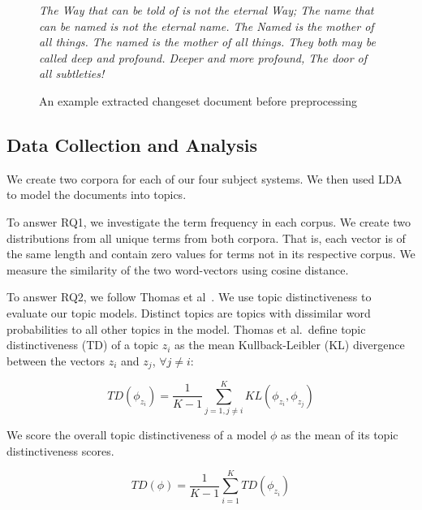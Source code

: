\begin{figure}[ht]
\em
\footnotesize
The Way that can be told of is not the eternal Way;
The name that can be named is not the eternal name.
The Named is the mother of all things.
The named is the mother of all things.
They both may be called deep and profound.
Deeper and more profound,
The door of all subtleties!
\caption{An example extracted changeset document before preprocessing}
\label{fig:diffdocument}
\end{figure}




\subsection{Data Collection and Analysis}

We create two corpora for each of our four subject systems.
We then used LDA to model the documents into topics.

To answer RQ1, we investigate the term frequency in each corpus.
We create two distributions from all unique terms from both corpora.
That is, each vector is of the same length and contain zero values for terms not in its respective corpus.
We measure the similarity of the two word-vectors using cosine distance.

To answer RQ2, we follow Thomas et al~\cite{Thomas-etal:2011}.
We use topic distinctiveness to evaluate our topic models.
Distinct topics are topics with dissimilar word probabilities to all other topics in the model.
Thomas et al.\ define topic distinctiveness (TD) of a topic $z_i$ as the mean
Kullback-Leibler (KL) divergence between the vectors $z_i$ and $z_j$, $\forall j \neq i$:

\begin{equation}
TD(\phi_{z_i}) =
\frac{1}{K - 1}
\sum_{j=1,j \neq i}^{K}
KL(\phi_{z_i}, \phi_{z_j})
\label{eq:topicdistinctiveness}
\end{equation}

We score the overall topic distinctiveness of a model $\phi$ as the mean of
its topic distinctiveness scores.

\begin{equation}
TD(\phi) =
\frac{1}{K - 1}
\sum_{i=1}^{K}
TD(\phi_{z_i})
\label{eq:overalltopicdistinctiveness}
\end{equation}



